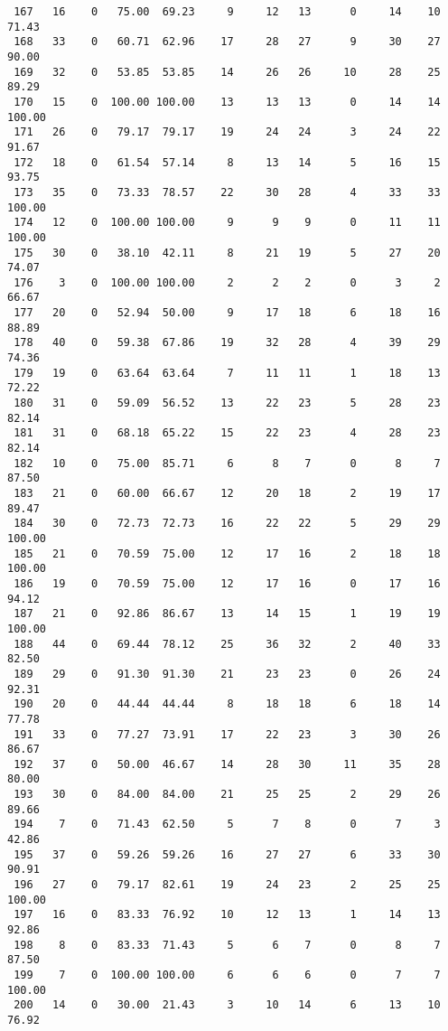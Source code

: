 \begin{verbatim}
 167   16    0   75.00  69.23     9     12   13      0     14    10    71.43
 168   33    0   60.71  62.96    17     28   27      9     30    27    90.00
 169   32    0   53.85  53.85    14     26   26     10     28    25    89.29
 170   15    0  100.00 100.00    13     13   13      0     14    14   100.00
 171   26    0   79.17  79.17    19     24   24      3     24    22    91.67
 172   18    0   61.54  57.14     8     13   14      5     16    15    93.75
 173   35    0   73.33  78.57    22     30   28      4     33    33   100.00
 174   12    0  100.00 100.00     9      9    9      0     11    11   100.00
 175   30    0   38.10  42.11     8     21   19      5     27    20    74.07
 176    3    0  100.00 100.00     2      2    2      0      3     2    66.67
 177   20    0   52.94  50.00     9     17   18      6     18    16    88.89
 178   40    0   59.38  67.86    19     32   28      4     39    29    74.36
 179   19    0   63.64  63.64     7     11   11      1     18    13    72.22
 180   31    0   59.09  56.52    13     22   23      5     28    23    82.14
 181   31    0   68.18  65.22    15     22   23      4     28    23    82.14
 182   10    0   75.00  85.71     6      8    7      0      8     7    87.50
 183   21    0   60.00  66.67    12     20   18      2     19    17    89.47
 184   30    0   72.73  72.73    16     22   22      5     29    29   100.00
 185   21    0   70.59  75.00    12     17   16      2     18    18   100.00
 186   19    0   70.59  75.00    12     17   16      0     17    16    94.12
 187   21    0   92.86  86.67    13     14   15      1     19    19   100.00
 188   44    0   69.44  78.12    25     36   32      2     40    33    82.50
 189   29    0   91.30  91.30    21     23   23      0     26    24    92.31
 190   20    0   44.44  44.44     8     18   18      6     18    14    77.78
 191   33    0   77.27  73.91    17     22   23      3     30    26    86.67
 192   37    0   50.00  46.67    14     28   30     11     35    28    80.00
 193   30    0   84.00  84.00    21     25   25      2     29    26    89.66
 194    7    0   71.43  62.50     5      7    8      0      7     3    42.86
 195   37    0   59.26  59.26    16     27   27      6     33    30    90.91
 196   27    0   79.17  82.61    19     24   23      2     25    25   100.00
 197   16    0   83.33  76.92    10     12   13      1     14    13    92.86
 198    8    0   83.33  71.43     5      6    7      0      8     7    87.50
 199    7    0  100.00 100.00     6      6    6      0      7     7   100.00
 200   14    0   30.00  21.43     3     10   14      6     13    10    76.92

\end{verbatim}
